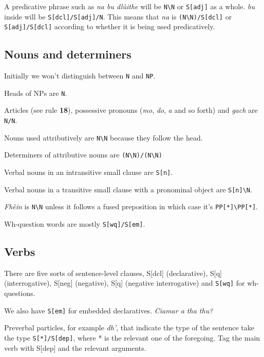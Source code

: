 \documentclass[a4paper]{article}
\begin{document}
 A predicative phrase such as \textit{na bu dl\`uithe} will be \texttt{N\textbackslash N} or \texttt{S[adj]} as a whole. \textit{bu} inside will be \texttt{S[dcl]/S[adj]/N}. This means that \textit{na} is \texttt{(N\textbackslash N)/S[dcl]} or \texttt{S[adj]/S[dcl]} according to whether it is being used predicatively.

\subsection{Nouns and determiners}

Initially we won't distinguish between \texttt{N} and \texttt{NP}.

 Heads of NPs are \texttt{N}.

 Articles (see rule {\bf 18}), possessive pronouns (\textit{mo}, \textit{do}, \textit{a} and so forth) and \textit{gach} are \texttt{N/N}.

 Nouns used attributively are \texttt{N\textbackslash N} because they follow the head.

 Determiners of attributive nouns are \texttt{(N\textbackslash N)/(N\textbackslash N)}

 Verbal nouns in an intransitive small clause are \texttt{S[n]}.

 Verbal nouns in a transitive small clause with a pronominal object are \texttt{S[n]\textbackslash N}.

 \textit{Fh\`ein} is \texttt{N\textbackslash N} unless it follows a fused preposition in which case it's \texttt{PP[*]\textbackslash PP[*]}.

 Wh-question words are mostly \texttt{S[wq]/S[em]}.

\subsection{Verbs}

 There are five sorts of sentence-level clauses, S[dcl] (declarative), S[q] (interrogative), S[neg] (negative), S[q] (negative interrogative) and \texttt{S[wq]} for wh-questions.

 We also have \texttt{S[em]} for embedded declaratives. \textit{Ciamar a tha thu?}

 Preverbal particles, for example \textit{dh'}, that indicate the type of the sentence take the type \texttt{S[*]/S[dep]}, where * is the relevant one of the foregoing. Tag the main verb with S[dep] and the relevant arguments.
\end{document}
